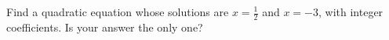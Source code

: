 \begin{extensionbox}
Find a quadratic equation whose solutions are $x=\tfrac12$ and $x=-3$, with integer
coefficients. Is your answer the only one? \blank{4cm}
\end{extensionbox}
